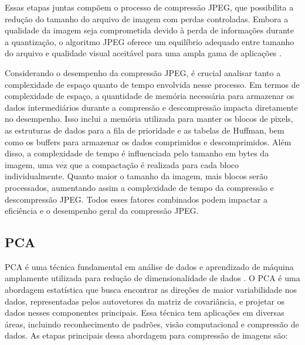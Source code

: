 \noindent Essas etapas juntas compõem o processo de compressão \acrshort{JPEG}, que possibilita a redução do tamanho do arquivo de imagem com perdas controladas. Embora a qualidade da imagem seja comprometida devido à perda de informações durante a quantização, o algoritmo \acrshort{JPEG} oferece um equilíbrio adequado entre tamanho do arquivo e qualidade visual aceitável para uma ampla gama de aplicações \cite{digitalImageProcessingGonzalez}.

Considerando o desempenho da compressão \acrshort{JPEG}, é crucial analisar tanto a complexidade de espaço quanto de tempo envolvida nesse processo. Em termos de complexidade de espaço, a quantidade de memória necessária para armazenar os dados intermediários durante a compressão e descompressão impacta diretamente no desempenho. Isso inclui a memória utilizada para manter os blocos de pixels, as estruturas de dados para a fila de prioridade e as tabelas de Huffman, bem como os buffers para armazenar os dados comprimidos e descomprimidos. Além disso, a complexidade de tempo é influenciada pelo tamanho em bytes da imagem, uma vez que a compactação é realizada para cada bloco individualmente. Quanto maior o tamanho da imagem, mais blocos serão processados, aumentando assim a complexidade de tempo da compressão e descompressão \acrshort{JPEG}. Todos esses fatores combinados podem impactar a eficiência e o desempenho geral da compressão \acrshort{JPEG}.

\subsection{\acrfull{PCA}}
\acrfull{PCA} é uma técnica fundamental em análise de dados e  aprendizado de máquina amplamente utilizada para redução de dimensionalidade de dados \cite{multivariateAnalysis}. O \acrshort{PCA} é uma abordagem estatística que busca encontrar as direções de maior variabilidade nos dados, representadas pelos autovetores da matriz de covariância, e projetar os dados nesses componentes principais. Essa técnica tem aplicações em diversas áreas, incluindo reconhecimento de padrões, visão computacional e compressão de dados. As etapas principais dessa abordagem para compressão de imagens são:

